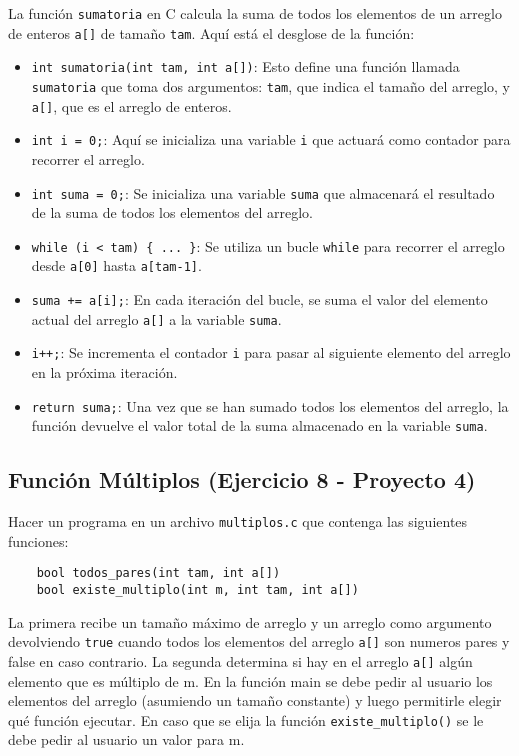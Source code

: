 \documentclass{article}
\begin{document}
La función \texttt{sumatoria} en C calcula la suma de todos los elementos de un arreglo de enteros \texttt{a[]} de tamaño \texttt{tam}. Aquí está el desglose de la función:

\begin{itemize}
    \item \texttt{int sumatoria(int tam, int a[])}: Esto define una función llamada \texttt{sumatoria} que toma dos argumentos: \texttt{tam}, que indica el tamaño del arreglo, y \texttt{a[]}, que es el arreglo de enteros.
    
    \item \texttt{int i = 0;}: Aquí se inicializa una variable \texttt{i} que actuará como contador para recorrer el arreglo.
    
    \item \texttt{int suma = 0;}: Se inicializa una variable \texttt{suma} que almacenará el resultado de la suma de todos los elementos del arreglo.
    
    \item \texttt{while (i < tam) \{ ... \}}: Se utiliza un bucle \texttt{while} para recorrer el arreglo desde \texttt{a[0]} hasta \texttt{a[tam-1]}.
    
    \item \texttt{suma += a[i];}: En cada iteración del bucle, se suma el valor del elemento actual del arreglo \texttt{a[]} a la variable \texttt{suma}.
    
    \item \texttt{i++;}: Se incrementa el contador \texttt{i} para pasar al siguiente elemento del arreglo en la próxima iteración.
    
    \item \texttt{return suma;}: Una vez que se han sumado todos los elementos del arreglo, la función devuelve el valor total de la suma almacenado en la variable \texttt{suma}.
\end{itemize}

\subsection{Función Múltiplos (Ejercicio 8 - Proyecto 4)}
Hacer un programa en un archivo \texttt{multiplos.c} que contenga las siguientes funciones:
\begin{verbatim}
    bool todos_pares(int tam, int a[])
    bool existe_multiplo(int m, int tam, int a[])
\end{verbatim}
La primera recibe un tamaño máximo de arreglo y un arreglo como argumento devolviendo \texttt{true} cuando todos los elementos del arreglo \texttt{a[]} son numeros pares y false en caso contrario. La segunda determina si hay en el arreglo \texttt{a[]} algún elemento que es múltiplo de m. En la función main se debe pedir al usuario los elementos del arreglo (asumiendo un tamaño constante) y luego permitirle elegir qué función ejecutar. En caso que se elija la función \texttt{existe\_multiplo()} se le debe pedir al usuario un valor para m.
\end{document}
